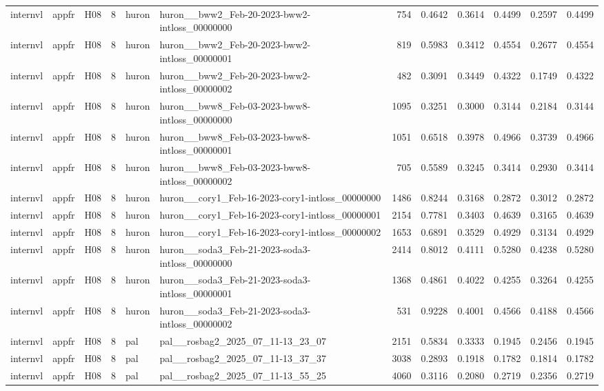 \begin{table}[tbp]
\begin{tabular}{lllrllrrrrrr}
internvl & appfr & H08 & 8 & huron & huron\_\_bww2\_Feb-20-2023-bww2-intloss\_00000000 & 754 & 0.4642 & 0.3614 & 0.4499 & 0.2597 & 0.4499 \\
internvl & appfr & H08 & 8 & huron & huron\_\_bww2\_Feb-20-2023-bww2-intloss\_00000001 & 819 & 0.5983 & 0.3412 & 0.4554 & 0.2677 & 0.4554 \\
internvl & appfr & H08 & 8 & huron & huron\_\_bww2\_Feb-20-2023-bww2-intloss\_00000002 & 482 & 0.3091 & 0.3449 & 0.4322 & 0.1749 & 0.4322 \\
internvl & appfr & H08 & 8 & huron & huron\_\_bww8\_Feb-03-2023-bww8-intloss\_00000000 & 1095 & 0.3251 & 0.3000 & 0.3144 & 0.2184 & 0.3144 \\
internvl & appfr & H08 & 8 & huron & huron\_\_bww8\_Feb-03-2023-bww8-intloss\_00000001 & 1051 & 0.6518 & 0.3978 & 0.4966 & 0.3739 & 0.4966 \\
internvl & appfr & H08 & 8 & huron & huron\_\_bww8\_Feb-03-2023-bww8-intloss\_00000002 & 705 & 0.5589 & 0.3245 & 0.3414 & 0.2930 & 0.3414 \\
internvl & appfr & H08 & 8 & huron & huron\_\_cory1\_Feb-16-2023-cory1-intloss\_00000000 & 1486 & 0.8244 & 0.3168 & 0.2872 & 0.3012 & 0.2872 \\
internvl & appfr & H08 & 8 & huron & huron\_\_cory1\_Feb-16-2023-cory1-intloss\_00000001 & 2154 & 0.7781 & 0.3403 & 0.4639 & 0.3165 & 0.4639 \\
internvl & appfr & H08 & 8 & huron & huron\_\_cory1\_Feb-16-2023-cory1-intloss\_00000002 & 1653 & 0.6891 & 0.3529 & 0.4929 & 0.3134 & 0.4929 \\
internvl & appfr & H08 & 8 & huron & huron\_\_soda3\_Feb-21-2023-soda3-intloss\_00000000 & 2414 & 0.8012 & 0.4111 & 0.5280 & 0.4238 & 0.5280 \\
internvl & appfr & H08 & 8 & huron & huron\_\_soda3\_Feb-21-2023-soda3-intloss\_00000001 & 1368 & 0.4861 & 0.4022 & 0.4255 & 0.3264 & 0.4255 \\
internvl & appfr & H08 & 8 & huron & huron\_\_soda3\_Feb-21-2023-soda3-intloss\_00000002 & 531 & 0.9228 & 0.4001 & 0.4566 & 0.4188 & 0.4566 \\
internvl & appfr & H08 & 8 & pal & pal\_\_rosbag2\_2025\_07\_11-13\_23\_07 & 2151 & 0.5834 & 0.3333 & 0.1945 & 0.2456 & 0.1945 \\
internvl & appfr & H08 & 8 & pal & pal\_\_rosbag2\_2025\_07\_11-13\_37\_37 & 3038 & 0.2893 & 0.1918 & 0.1782 & 0.1814 & 0.1782 \\
internvl & appfr & H08 & 8 & pal & pal\_\_rosbag2\_2025\_07\_11-13\_55\_25 & 4060 & 0.3116 & 0.2080 & 0.2719 & 0.2356 & 0.2719 \\

\end{tabular}
\end{table}

